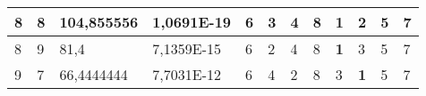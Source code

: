 \documentclass[conference]{IEEEtran}
\begin{document}
\begin{table*}[]
\begin{tabular}{|llll|llllllll|}
\multicolumn{1}{|l|}{8}                                                     & \multicolumn{1}{l|}{8}                                                        & \multicolumn{1}{l|}{104,855556}                                                   & 1,0691E-19                     & \multicolumn{1}{l|}{6}                                                  & \multicolumn{1}{l|}{3}                                                  & \multicolumn{1}{l|}{4}                                                  & \multicolumn{1}{l|}{8}                                                  & \multicolumn{1}{l|}{\textbf{1}}                                         & \multicolumn{1}{l|}{2}                                                  & \multicolumn{1}{l|}{5}                                                  & 7                          \\ \hline
\multicolumn{1}{|l|}{8}                                                     & \multicolumn{1}{l|}{9}                                                        & \multicolumn{1}{l|}{81,4}                                                         & 7,1359E-15                     & \multicolumn{1}{l|}{6}                                                  & \multicolumn{1}{l|}{2}                                                  & \multicolumn{1}{l|}{4}                                                  & \multicolumn{1}{l|}{8}                                                  & \multicolumn{1}{l|}{\textbf{1}}                                         & \multicolumn{1}{l|}{3}                                                  & \multicolumn{1}{l|}{5}                                                  & 7                          \\ \hline
\multicolumn{1}{|l|}{9}                                                     & \multicolumn{1}{l|}{7}                                                        & \multicolumn{1}{l|}{66,4444444}                                                   & 7,7031E-12                     & \multicolumn{1}{l|}{6}                                                  & \multicolumn{1}{l|}{4}                                                  & \multicolumn{1}{l|}{2}                                                  & \multicolumn{1}{l|}{8}                                                  & \multicolumn{1}{l|}{3}                                                  & \multicolumn{1}{l|}{\textbf{1}}                                         & \multicolumn{1}{l|}{5}                                                  & 7                          \\ \hline

\end{tabular}
\end{table*}
\end{document}
